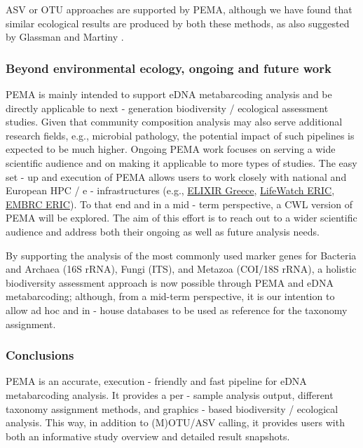    ASV or OTU approaches are supported by PEMA, although we have found that similar ecological results are produced by both these methods, as also suggested by Glassman and Martiny \citep{glassman2018broadscale}.


   \subsubsection*{Beyond environmental ecology, ongoing and future work}

   PEMA is mainly intended to support eDNA metabarcoding analysis and be directly applicable to next - generation biodiversity / ecological assessment studies. 
   Given that community composition analysis may also serve additional research fields, e.g., microbial pathology, the potential impact of such pipelines is expected to be much higher. 
   Ongoing PEMA work focuses on serving a wide scientific audience and on making it applicable to more types of studies. 
   The easy set - up and execution of PEMA allows users to work closely with national and European HPC / e - infrastructures (e.g., \href{https://www.elixir-greece.org/}{ELIXIR Greece}, \href{https://www.lifewatch.eu/}{LifeWatch ERIC}, \href{ http://www.embrc.eu}{EMBRC ERIC}). 
   To that end and in a mid - term perspective, a CWL version of PEMA will be explored. 
   The aim of this effort is to reach out to a wider scientific audience and address both their ongoing as well as future analysis needs.

   By supporting the analysis of the most commonly used marker genes for Bacteria and Archaea (16S rRNA), Fungi (ITS), and Metazoa (COI/18S rRNA), a holistic biodiversity assessment approach is now possible through PEMA and eDNA metabarcoding; although, from a mid-term perspective, it is our intention to allow ad hoc and in - house databases to be used as reference for the taxonomy assignment.

   \subsubsection*{Conclusions}

   PEMA is an accurate, execution - friendly and fast pipeline for eDNA metabarcoding analysis. 
   It provides a per - sample analysis output, different taxonomy assignment methods, and graphics - based biodiversity / ecological analysis. 
   This way, in addition to (M)OTU/ASV calling, it provides users with both an informative study overview and detailed result snapshots.

